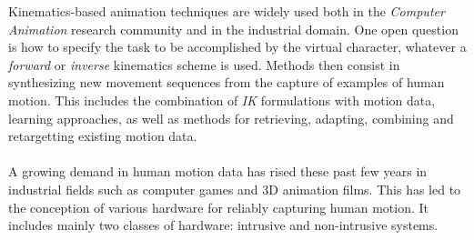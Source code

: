 



					\label{subsubsubsubsec:CA_MC_Kinematics_Task}

Kinematics-based animation techniques are widely used both in the \emph{Computer Animation} research community and in the industrial domain. One open question is how to specify the task to be accomplished by the virtual character, whatever a \emph{forward} or \emph{inverse} kinematics scheme is used. Methods then consist in synthesizing new movement sequences from the capture of examples of human motion. This includes the combination of \emph{IK} formulations with motion data, learning approaches, as well as methods for retrieving, adapting, combining and retargetting existing motion data.\\


						\\

A growing demand in human motion data has rised these past few years in industrial fields such as computer games and 3D animation films. This has led to the conception of various hardware for reliably capturing human motion. It includes mainly two classes of hardware: intrusive and non-intrusive systems.

